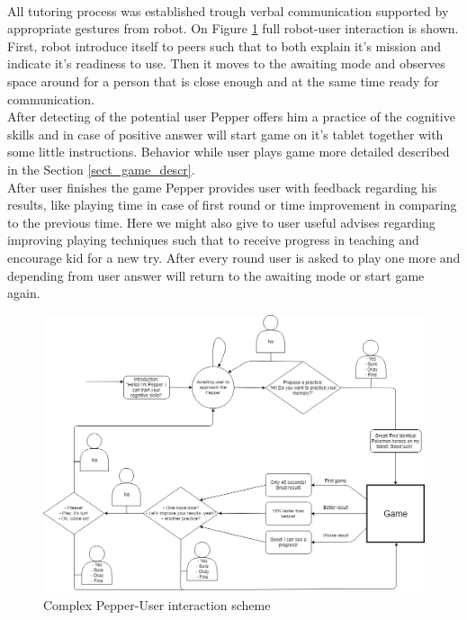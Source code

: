 \documentclass[12pt]{article}
\begin{document}
\\
All tutoring process was established trough verbal communication supported by appropriate gestures from robot. On Figure \ref{concept_scheme} full robot-user interaction is shown. 
\\
First, robot introduce itself to peers such that to both explain it's mission and indicate it's readiness to use. Then it moves to the awaiting mode and observes space around for a person that is close enough and at the same time ready for communication.
\\
After detecting of the potential user Pepper offers him a practice of the cognitive skills and in case of positive answer will start game on it's tablet together with some little instructions. Behavior while user plays game more detailed described in the Section \ref{sect_game_descr}.
\\
After user finishes the game Pepper provides user with feedback regarding his results, like playing time in case of first round or time  improvement in comparing to the previous time. Here we might also give to user useful advises regarding improving playing techniques such that to receive progress in teaching and encourage kid for a new try. After  every round user is asked to play one more and depending from user answer will return to the awaiting mode or start game again.
\begin{figure}[!h]
\begin{center}
\includegraphics[scale=0.43]{images/HRI_concept.png}
\caption{Complex Pepper-User interaction scheme}
\label{concept_scheme}
\end{center}
\end{figure}
\end{document}

